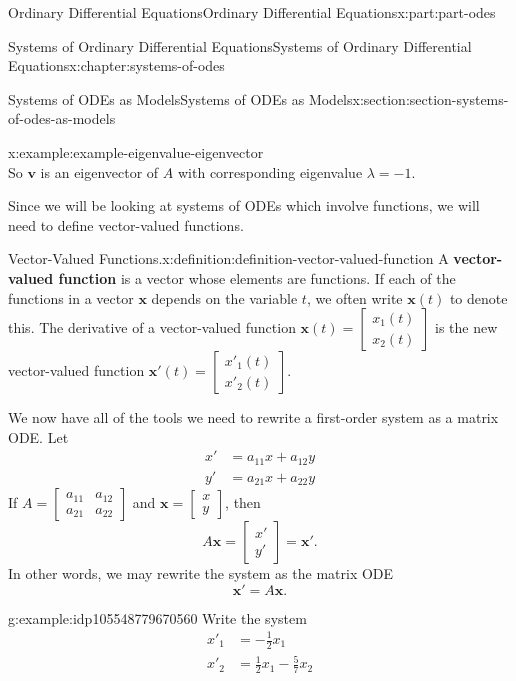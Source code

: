 \documentclass[oneside,10pt,]{book}
\newcommand{\terminology}[1]{\textbf{#1}}
\numberwithin{equation}{part}
\renewcommand{\vec}[1]{\mathbf{#1}}
\newcommand{\amp}{&}
\begin{document}
\begin{partptx}{Ordinary Differential Equations}{}{Ordinary Differential Equations}{}{}{x:part:part-odes}
\begin{chapterptx}{Systems of Ordinary Differential Equations}{}{Systems of Ordinary Differential Equations}{}{}{x:chapter:systems-of-odes}
\begin{sectionptx}{Systems of ODEs as Models}{}{Systems of ODEs as Models}{}{}{x:section:section-systems-of-odes-as-models}
\begin{example}{}{x:example:example-eigenvalue-eigenvector}
\begin{equation*}
\end{equation*}
So \(\vec{v}\) is an eigenvector of \(A\) with corresponding eigenvalue \(\lambda=-1\).%
\end{example}
Since we will be looking at systems of ODEs which involve functions, we will need to define vector-valued functions.%
\begin{definition}{Vector-Valued Functions.}{x:definition:definition-vector-valued-function}%
A \terminology{vector-valued function} is a vector whose elements are functions. If each of the functions in a vector \(\vec{x}\) depends on the variable \(t\), we often write \(\vec{x}(t)\) to denote this. The derivative of a vector-valued function \(\vec{x}(t) = \begin{bmatrix}x_{1}(t)\\x_{2}(t)\end{bmatrix}\) is the new vector-valued function \(\vec{x}'(t)=\begin{bmatrix}x'_{1}(t)\\x'_{2}(t)\end{bmatrix}\).%
\end{definition}
We now have all of the tools we need to rewrite a first-order system as a matrix ODE. Let%
\begin{align*}
x' \amp= a_{11}x+a_{12}y\\
y' \amp= a_{21}x+a_{22}y
\end{align*}
If \(A = \begin{bmatrix}a_{11}\amp a_{12} \\ a_{21}\amp a_{22}\end{bmatrix}\) and \(\vec{x} = \begin{bmatrix}x\\y\end{bmatrix}\), then%
\begin{equation*}
A\vec{x} = \begin{bmatrix}x'\\y'\end{bmatrix} = \vec{x}'.
\end{equation*}
In other words, we may rewrite the system as the matrix ODE%
\begin{equation*}
\vec{x}' =A\vec{x}.
\end{equation*}
%
\begin{example}{}{g:example:idp105548779670560}%
Write the system%
\begin{align*}
x'_{1}  \amp = -\frac{1}{2}x_{1}\\
x'_{2}  \amp = \frac{1}{2}x_{1}-\frac{5}{7}x_{2}

\end{align*}
\end{example}
\end{sectionptx}
\end{chapterptx}
\end{partptx}
\end{document}
